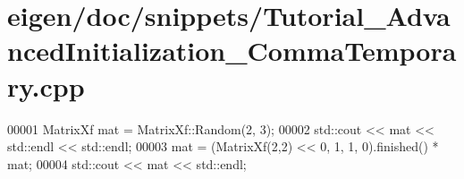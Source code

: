 \hypertarget{eigen_2doc_2snippets_2_tutorial___advanced_initialization___comma_temporary_8cpp_source}{}\section{eigen/doc/snippets/\+Tutorial\+\_\+\+Advanced\+Initialization\+\_\+\+Comma\+Temporary.cpp}
\label{eigen_2doc_2snippets_2_tutorial___advanced_initialization___comma_temporary_8cpp_source}

\begin{DoxyCode}
00001 MatrixXf mat = MatrixXf::Random(2, 3);
00002 std::cout << mat << std::endl << std::endl;
00003 mat = (MatrixXf(2,2) << 0, 1, 1, 0).finished() * mat;
00004 std::cout << mat << std::endl;
\end{DoxyCode}
